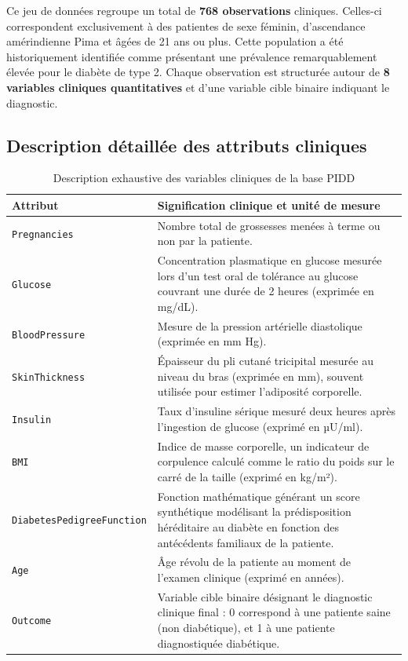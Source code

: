 Ce jeu de données regroupe un total de \textbf{768 observations} cliniques. Celles-ci correspondent exclusivement à des patientes de sexe féminin, d'ascendance amérindienne Pima et âgées de 21 ans ou plus. Cette population a été historiquement identifiée comme présentant une prévalence remarquablement élevée pour le diabète de type 2. Chaque observation est structurée autour de \textbf{8 variables cliniques quantitatives} et d'une variable cible binaire indiquant le diagnostic.

\subsection{Description détaillée des attributs cliniques}

\begin{table}[htbp]
    \centering
    \caption{Description exhaustive des variables cliniques de la base PIDD}
    \label{tab:pidd_attributes}
    \small
    \begin{tabular}{p{4.5cm} p{8.5cm}}
        \hline
        \textbf{Attribut} & \textbf{Signification clinique et unité de mesure} \\
        \hline
        \texttt{Pregnancies} & Nombre total de grossesses menées à terme ou non par la patiente. \\
        \texttt{Glucose} & Concentration plasmatique en glucose mesurée lors d'un test oral de tolérance au glucose couvrant une durée de 2 heures (exprimée en mg/dL). \\
        \texttt{BloodPressure} & Mesure de la pression artérielle diastolique (exprimée en mm Hg). \\
        \texttt{SkinThickness} & Épaisseur du pli cutané tricipital mesurée au niveau du bras (exprimée en mm), souvent utilisée pour estimer l'adiposité corporelle. \\
        \texttt{Insulin} & Taux d'insuline sérique mesuré deux heures après l'ingestion de glucose (exprimé en µU/ml). \\
        \texttt{BMI} & Indice de masse corporelle, un indicateur de corpulence calculé comme le ratio du poids sur le carré de la taille (exprimé en kg/m²). \\
        \texttt{DiabetesPedigreeFunction} & Fonction mathématique générant un score synthétique modélisant la prédisposition héréditaire au diabète en fonction des antécédents familiaux de la patiente. \\
        \texttt{Age} & Âge révolu de la patiente au moment de l'examen clinique (exprimé en années). \\
        \texttt{Outcome} & Variable cible binaire désignant le diagnostic clinique final : 0 correspond à une patiente saine (non diabétique), et 1 à une patiente diagnostiquée diabétique. \\
        \hline
    \end{tabular}
\end{table}

